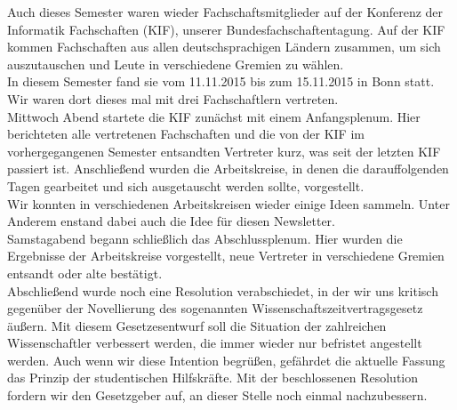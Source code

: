 Auch dieses Semester waren wieder Fachschaftsmitglieder auf der Konferenz der Informatik Fachschaften (KIF), unserer Bundesfachschaftentagung. Auf der KIF kommen Fachschaften aus allen deutschsprachigen Ländern zusammen, um sich auszutauschen und Leute in verschiedene Gremien zu wählen.\\
In diesem Semester fand sie vom 11.11.2015 bis zum 15.11.2015 in Bonn statt. Wir waren dort dieses mal mit drei Fachschaftlern vertreten.\\
Mittwoch Abend startete die KIF zunächst mit einem Anfangsplenum. Hier berichteten alle vertretenen Fachschaften und die von der KIF im vorhergegangenen Semester entsandten Vertreter kurz, was seit der letzten KIF passiert ist. Anschließend wurden die Arbeitskreise, in denen die darauffolgenden Tagen gearbeitet und sich ausgetauscht werden sollte, vorgestellt.\\
Wir konnten in verschiedenen Arbeitskreisen wieder einige Ideen sammeln. Unter Anderem enstand dabei auch die Idee für diesen Newsletter.\\
Samstagabend begann schließlich das Abschlussplenum. Hier wurden die Ergebnisse der Arbeitskreise vorgestellt, neue Vertreter in verschiedene Gremien entsandt oder alte bestätigt.\\
Abschließend wurde noch eine Resolution verabschiedet, in der wir uns kritisch gegenüber der Novellierung des sogenannten Wissenschaftszeitvertragsgesetz äußern. Mit diesem Gesetzesentwurf soll die Situation der zahlreichen Wissenschaftler verbessert werden, die immer wieder nur befristet angestellt werden. Auch wenn wir diese Intention begrüßen, gefährdet die aktuelle Fassung das Prinzip der studentischen Hilfskräfte. Mit der beschlossenen Resolution fordern wir den Gesetzgeber auf, an dieser Stelle noch einmal nachzubessern.


